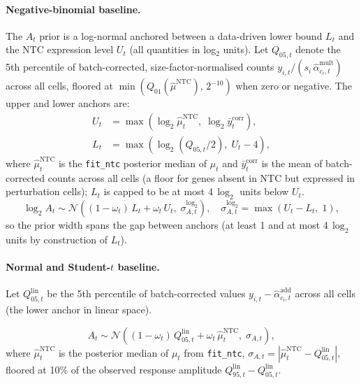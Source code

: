 \documentclass[12pt]{article}
\begin{document}
\paragraph{Negative-binomial baseline.}

The $A_t$ prior is a log-normal anchored between a data-driven lower bound $L_t$ and
the NTC expression level $U_t$ (all quantities in log$_2$ units).
Let $Q_{05,t}$ denote the 5th percentile of batch-corrected, size-factor-normalised
counts $y_{i,t}/(s_i\,\hat\alpha_{c_i,t}^{\mathrm{mult}})$ across all cells, floored
at $\min(Q_{01}(\hat\mu^{\mathrm{NTC}}),\, 2^{-10})$ when zero or negative.
The upper and lower anchors are:
\begin{align}
  U_t &= \max\!\left(\log_2 \hat\mu_t^{\mathrm{NTC}},\; \log_2 \bar y_t^{\mathrm{corr}}\right), \\
  L_t &= \max\!\left(\log_2(Q_{05,t}/2),\; U_t - 4\right),
\end{align}
where $\hat\mu_t^{\mathrm{NTC}}$ is the \texttt{fit\_ntc} posterior median of $\mu_t$ and
$\bar y_t^{\mathrm{corr}}$ is the mean of batch-corrected counts across all cells
(a floor for genes absent in NTC but expressed in perturbation cells);
$L_t$ is capped to be at most 4\,$\log_2$ units below $U_t$.
\begin{equation}
  \log_2 A_t \sim \mathcal{N}\!\left(
    (1 - \omega_t)\,L_t + \omega_t\,U_t,\;
    \sigma_{A,t}^{\log_2}\right),
  \quad \sigma_{A,t}^{\log_2} = \max(U_t - L_t,\; 1),
  \label{eq:trans_A_nb}
\end{equation}
so the prior width spans the gap between anchors (at least 1 and at most 4\,$\log_2$
units by construction of $L_t$).

\paragraph{Normal and Student-$t$ baseline.}

Let $Q_{05,t}^{\mathrm{lin}}$ be the 5th percentile of batch-corrected values
$y_{i,t} - \hat\alpha_{c_i,t}^{\mathrm{add}}$ across all cells (the lower anchor in
linear space).

\begin{equation}
  A_t \sim \mathcal{N}\!\left(
    (1 - \omega_t)\,Q_{05,t}^{\mathrm{lin}}
    + \omega_t\,\hat\mu_t^{\mathrm{NTC}},\;
    \sigma_{A,t}\right),
\end{equation}
%
where $\hat\mu_t^{\mathrm{NTC}}$ is the posterior median of $\mu_t$ from \texttt{fit\_ntc},
$\sigma_{A,t} = |\hat\mu_t^{\mathrm{NTC}} - Q_{05,t}^{\mathrm{lin}}|$,
floored at 10\% of the observed response amplitude $Q_{95,t}^{\mathrm{lin}} - Q_{05,t}^{\mathrm{lin}}$.
\end{document}
